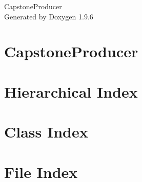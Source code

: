 \documentclass[twoside]{book}
\newcommand{\+}{\discretionary{\mbox{\scriptsize$\hookleftarrow$}}{}{}}
\newcommand{\clearemptydoublepage}{%
    \newpage{\pagestyle{empty}\cleardoublepage}%
  }
\begin{document}
  \raggedbottom
    \hypersetup{pageanchor=false,
                bookmarksnumbered=true,
                pdfencoding=unicode
               }
  \begin{titlepage}
  \vspace*{7cm}
  \begin{center}%
  {\Large Capstone\+Producer}\\
  \vspace*{1cm}
  {\large Generated by Doxygen 1.9.6}\\
  \end{center}
  \end{titlepage}
  \clearemptydoublepage
  \tableofcontents
  \clearemptydoublepage
  \hypersetup{pageanchor=true}
\chapter{Capstone\+Producer}
\label{md_README}

\chapter{Hierarchical Index}

\chapter{Class Index}

\chapter{File Index}

\end{document}
